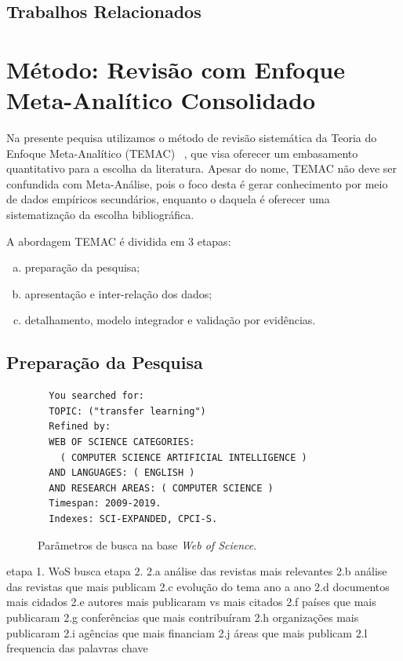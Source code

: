 \documentclass[sigconf]{acmart}
\begin{document}
  \subsection{Trabalhos Relacionados}
  \lipsum[2]
\section{Método: Revisão com Enfoque Meta-Analítico Consolidado}
Na presente pequisa utilizamos o método de revisão sistemática da Teoria do Enfoque Meta-Analítico (TEMAC) ~\cite{Mariano}, que visa oferecer um embasamento quantitativo para a escolha da literatura. Apesar do nome, TEMAC não deve ser confundida com Meta-Análise, pois o foco desta é gerar conhecimento por meio de dados empíricos secundários, enquanto o daquela é oferecer uma sistematização da escolha bibliográfica.

A abordagem TEMAC é dividida em 3 etapas: 
\begin{enumerate}[a)]
  \item preparação da pesquisa;
  \item apresentação e inter-relação dos dados;
  \item detalhamento, modelo integrador e validação por evidências.
\end{enumerate}

\subsection{Preparação da Pesquisa}
\begin{figure}[htp]
\begin{tcolorbox}[colback=yellow!5!white,colframe=gray!75!black,title={Results: 1,279 (from Web of Science Core Collection)}]
  \begin{verbatim}
  You searched for: 
  TOPIC: ("transfer learning")
  Refined by: 
  WEB OF SCIENCE CATEGORIES: 
    ( COMPUTER SCIENCE ARTIFICIAL INTELLIGENCE )
  AND LANGUAGES: ( ENGLISH ) 
  AND RESEARCH AREAS: ( COMPUTER SCIENCE )
  Timespan: 2009-2019. 
  Indexes: SCI-EXPANDED, CPCI-S.
  \end{verbatim}

\end{tcolorbox}
\caption{Parâmetros de busca na base \emph{Web of Science}.}
\end{figure}


etapa 1.
WoS busca
etapa 2.
2.a análise das revistas mais relevantes
2.b análise das revistas que mais publicam
2.c evolução do tema ano a ano
2.d documentos mais cidados
2.e autores mais publicaram vs mais citados
2.f países que mais publicaram
2.g conferências que mais contribuíram
2.h organizações mais publicaram
2.i agências que mais financiam
2.j áreas que mais publicam
2.l frequencia das palavras chave
\end{document}
